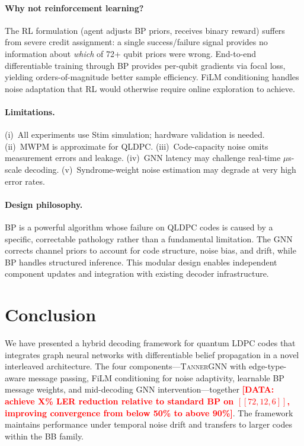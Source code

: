 \documentclass[a4paper,twocolumn,11pt,unpublished,nopdfoutputerror]{quantumarticle}
\newcommand{\code}[3]{\ensuremath{[\![#1,#2,#3]\!]}}
\newcommand{\pending}[1]{\textcolor{red}{\textbf{[#1]}}}
\begin{document}
\paragraph{Why not reinforcement learning?}
The RL formulation (agent adjusts BP priors, receives binary reward) suffers from severe credit assignment: a single success/failure signal provides no information about \emph{which} of 72+ qubit priors were wrong. End-to-end differentiable training through BP provides per-qubit gradients via focal loss, yielding orders-of-magnitude better sample efficiency. FiLM conditioning handles noise adaptation that RL would otherwise require online exploration to achieve.

\paragraph{Limitations.}
(i)~All experiments use Stim simulation; hardware validation is needed. (ii)~MWPM is approximate for QLDPC. (iii)~Code-capacity noise omits measurement errors and leakage. (iv)~GNN latency may challenge real-time $\mu$s-scale decoding. (v)~Syndrome-weight noise estimation may degrade at very high error rates.

\paragraph{Design philosophy.}
BP is a powerful algorithm whose failure on QLDPC codes is caused by a specific, correctable pathology rather than a fundamental limitation. The GNN corrects channel priors to account for code structure, noise bias, and drift, while BP handles structured inference. This modular design enables independent component updates and integration with existing decoder infrastructure.


\section{Conclusion}\label{sec:conclusion}

We have presented a hybrid decoding framework for quantum LDPC codes that integrates graph neural networks with differentiable belief propagation in a novel interleaved architecture. The four components---\textsc{TannerGNN} with edge-type-aware message passing, FiLM conditioning for noise adaptivity, learnable BP message weights, and mid-decoding GNN intervention---together \pending{DATA: achieve X\% LER reduction relative to standard BP on $\code{72}{12}{6}$, improving convergence from below 50\% to above 90\%}. The framework maintains performance under temporal noise drift and transfers to larger codes within the BB family.
\end{document}

